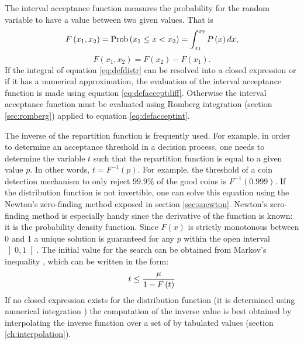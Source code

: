 The interval acceptance function measures the probability for the
random variable to have a value between two given values. That is
\begin{equation}
\label{eq:defacceptint}
  F\left(x_1,x_2\right)=\mathop{\textrm{Prob}}\left(x_1\le x<x_2\right)
  =\int_{x_1}^{x_2} P\left(x\right)dx,
\end{equation}
\begin{equation}
\label{eq:defacceptdiff}
  F\left(x_1,x_2\right)=F\left(x_2\right)-F\left(x_1\right).
\end{equation}
If the integral of equation \ref{eq:defdistr} can be resolved into
a closed expression or if it has a numerical approximation, the
evaluation of the interval acceptance function is made using
equation \ref{eq:defacceptdiff}. Otherwise the interval acceptance
function must be evaluated using Romberg integration (\cf section
\ref{sec:romberg}) applied to equation \ref{eq:defacceptint}.

The inverse of the repartition function is frequently used. For
example, in order to determine an acceptance threshold in a
decision process, one needs to determine the variable $t$ such
that the repartition function is equal to a given value $p$. In
other words, $t=F^{-1}\left(p\right)$. For example, the threshold
of a coin detection mechanism to only reject $99.9\%$ of the good
coins is $F^{-1}\left(0.999\right)$. If the distribution function
is not invertible, one can solve this equation using the Newton's
zero-finding method exposed in section \ref{sec:snewton}. Newton's
zero-finding method is especially handy since the derivative of
the function is known: it is the probability density function.
Since $F\left(x\right)$ is strictly monotonous between 0 and 1 a
unique solution is guaranteed for any $p$ within the open interval
$\left]0,1\right[$. The initial value for the search can be
obtained from Markov's inequality \cite{CorLeiRiv}, which can be
written in the form:
\begin{equation}
  t\le {\displaystyle \mu \over\displaystyle 1-F\left(t\right)}
\end{equation}
If no closed expression exists for the distribution function (it
is determined using numerical integration \eg) the computation of
the inverse value is best obtained by interpolating the inverse
function over a set of by tabulated values (\cf section
\ref{ch:interpolation}).

